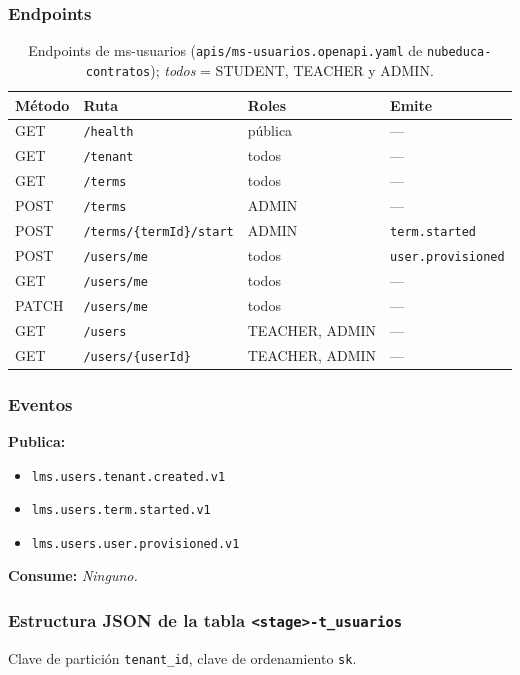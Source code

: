 \subsubsection{Endpoints}
\begin{table}[htbp]
\centering\footnotesize
\begin{tabularx}{\textwidth}{lXll}
\toprule
Método & Ruta & Roles & Emite \\
\midrule
GET    & \texttt{/health} & pública & --- \\
GET    & \texttt{/tenant} & todos & --- \\
GET    & \texttt{/terms} & todos & --- \\
POST   & \texttt{/terms} & ADMIN & --- \\
POST   & \texttt{/terms/\{termId\}/start} & ADMIN & \texttt{term.started} \\
POST   & \texttt{/users/me} & todos & \texttt{user.provisioned} \\
GET    & \texttt{/users/me} & todos & --- \\
PATCH  & \texttt{/users/me} & todos & --- \\
GET    & \texttt{/users} & TEACHER, ADMIN & --- \\
GET    & \texttt{/users/\{userId\}} & TEACHER, ADMIN & --- \\
\bottomrule
\end{tabularx}
\caption{Endpoints de ms-usuarios (\texttt{apis/ms-usuarios.openapi.yaml} de \texttt{nubeduca-contratos}); \textit{todos} = STUDENT, TEACHER y ADMIN.}
\end{table}

\subsubsection{Eventos}
\textbf{Publica:}
\begin{itemize}
  \item \texttt{lms.users.tenant.created.v1}
  \item \texttt{lms.users.term.started.v1}
  \item \texttt{lms.users.user.provisioned.v1}
\end{itemize}

\textbf{Consume:}
\textit{Ninguno.}


\subsubsection{Estructura JSON de la tabla \texttt{<stage>-t\_usuarios}}
Clave de partición \texttt{tenant\_id}, clave de ordenamiento \texttt{sk}.

